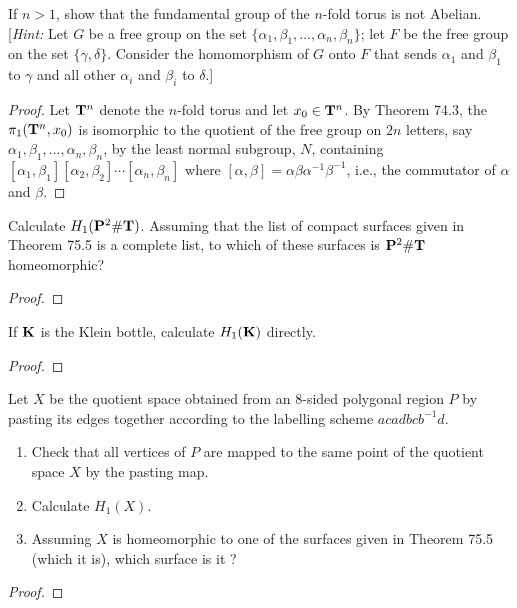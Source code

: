 \begin{problem}[Munkres \S74, Ex.\,6]
If $n>1$, show that the fundamental group of the $n$-fold torus is not
Abelian. [\emph{Hint:} Let $G$ be a free group on the set
$\{\alpha_1,\beta_1,...,\alpha_n,\beta_n\}$; let $F$ be the free group on
the set $\{\gamma,\delta\}$. Consider the homomorphism of $G$ onto $F$ that
sends $\alpha_1$ and $\beta_1$ to $\gamma$ and all other $\alpha_i$ and
$\beta_i$ to $\delta$.]
\end{problem}
\begin{proof}
Let $\mathbf{T}^n$ denote the $n$-fold torus and let $x_0\in\mathbf{T}^n$. By Theorem
74.3, the $\pi_1(\mathbf{T}^n,x_0)$ is isomorphic to the quotient of the free
group on $2n$ letters, say $\alpha_1,\beta_1,...,\alpha_n,\beta_n$, by the
least normal subgroup, $N$, containing
$[\alpha_1,\beta_1][\alpha_2,\beta_2]\cdots[\alpha_n,\beta_n]$ where
$[\alpha,\beta]=\alpha\beta\alpha^{-1}\beta^{-1}$, i.e., the commutator of
$\alpha$ and $\beta$.
\end{proof}
\newpage
\begin{problem}[Munkres \S76, Ex.\,1]
Calculate $H_1(\mathbf{P}^2\#\mathbf{T})$. Assuming that the list of compact surfaces given
in Theorem 75.5 is a complete list, to which of these surfaces is $\mathbf{P}^2\#\mathbf{T}$
homeomorphic?
\end{problem}
\begin{proof}
\end{proof}
\newpage
\begin{problem}[Munkres \S76, Ex.\,2]
If $\mathbf{K}$ is the Klein bottle, calculate $H_1(\mathbf{K})$ directly.
\end{problem}
\begin{proof}
\end{proof}
\newpage
\begin{problem}[Munkres \S76, Ex.\,3(a,b,c)]
Let $X$ be the quotient space obtained from an $8$-sided polygonal region
$P$ by pasting its edges together according to the labelling scheme
$acadbcb^{-1}d$.
\begin{enumerate}[label=(\alph*)]
\item Check that all vertices of $P$ are mapped to the same point of the
  quotient space $X$ by the pasting map.
\item Calculate $H_1(X)$.
\item Assuming $X$ is homeomorphic to one of the surfaces given in Theorem
  75.5 (which it is), which surface is it ?
\end{enumerate}
\end{problem}
\begin{proof}
\end{proof}
